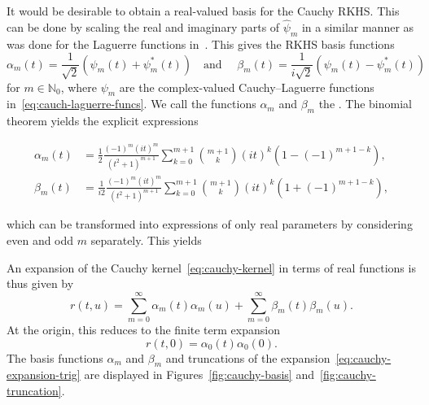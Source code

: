 \documentclass{article}
\newcommand{\tmcolor}[2]{{\color{#1}{#2}}}
\newcommand{\tmem}[1]{{\em #1\/}}
\newcommand{\N}{\mathbb{N}}
\newcommand{\rev}[1]{\tmcolor{black}{#1}}
\begin{document}
It would be desirable to obtain a real-valued basis for the Cauchy RKHS. This
can be done by scaling the real and imaginary parts of $\hat{\psi}_m$ in a
similar manner as was done for the Laguerre functions
in~{\cite{Christov1982}}. This gives the RKHS basis functions
\begin{equation}
  \label{eq:trig-cauchy-laguerre} \alpha_m (t) = \frac{1}{\sqrt{2}}  (\psi_m
  (t) + \psi_m^{\ast} (t))  \quad \text{and } \quad \beta_m (t) = \frac{1}{i
  \sqrt{2}}  (\psi_m (t) - \psi_m^{\ast} (t))
\end{equation}
for $m \in \N_0$, where $\psi_m$ are the complex-valued Cauchy--Laguerre
functions in~\eqref{eq:cauch-laguerre-funcs}. We call the functions $\alpha_m$
and $\beta_m$ the {\tmem{{\rev{real-valued Cauchy--Laguerre functions}}}}. The
binomial theorem yields the explicit expressions

\begin{align*}
  \alpha_m (t) & = \frac{1}{2}  \frac{(- 1)^m  (it)^m}{(t^2 + 1)^{m + 1}} 
  \sum_{k = 0}^{m + 1} \binom{m + 1}{k} (it)^k  (1 - (- 1)^{m + 1 - k}),\\
  \beta_m (t) & = \frac{1}{i 2}  \frac{(- 1)^m  (it)^m}{(t^2 + 1)^{m + 1}} 
  \sum_{k = 0}^{m + 1} \binom{m + 1}{k} (it)^k  (1 + (- 1)^{m + 1 - k}),
\end{align*}

which can be transformed into expressions of only real parameters by
considering even and odd $m$ separately. This yields

{}

An expansion of the Cauchy kernel~\eqref{eq:cauchy-kernel} in terms of real
functions is thus given by
\begin{equation}
  \label{eq:cauchy-expansion-trig} r (t, u) = \sum_{m = 0}^{\infty} \alpha_m
  (t) \alpha_m (u) + \sum_{m = 0}^{\infty} \beta_m (t) \beta_m (u) .
\end{equation}
At the origin, this reduces to the finite term expansion
\[ r (t, 0) = \alpha_0 (t) \alpha_0 (0) . \]
The basis functions $\alpha_m$ and $\beta_m$ and truncations of the
expansion~\eqref{eq:cauchy-expansion-trig} are displayed in 
Figures~\ref{fig:cauchy-basis} and~\ref{fig:cauchy-truncation}.
\end{document}
